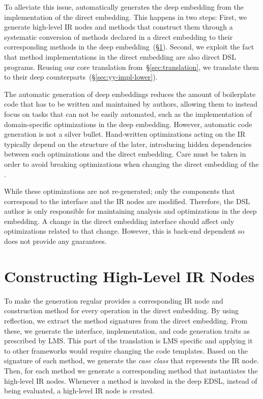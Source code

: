 To alleviate this issue, \yy automatically generates the deep embedding from
the implementation of the direct embedding. This happens in two steps: First, we
generate high-level IR nodes and methods that construct them through a
systematic conversion of methods declared in a direct embedding to their
corresponding methods in the deep embedding~(\S \ref{sec:yy-impl-def}).
%
Second, we exploit the fact that method implementations in the direct
embedding are also direct DSL programs.  Reusing our core translation
from~\S \ref{sec:translation}, we translate them to their deep
counterparts~(\S \ref{sec:yy-impl-lower}).



The automatic generation of deep embeddings reduces the amount of
boilerplate code that has to be written and maintained by \edsl
authors, allowing them to instead focus on tasks that can not be
easily automated, such as the implementation of domain-specific
optimizations in the deep embedding.  However, automatic code
generation is not a silver bullet.  Hand-written optimizations acting
on the IR typically depend on the structure of the later, introducing
hidden dependencies between such optimizations and the direct
embedding.  Care must be taken in order to avoid breaking
optimizations when changing the direct embedding of the \edsl.

 While these optimizations are not re-generated; only the
 components that correspond to the interface and the IR nodes are
 modified. Therefore, the DSL author is only responsible for
 maintaining analysis and optimizations in the deep embedding. A change
 in the direct embedding interface should affect only optimizations
 related to that change. However, this is back-end dependent so \yy
 does not provide any guarantees.


\section{Constructing High-Level IR Nodes}
\label{sec:yy-impl-def}

To make the generation regular \yy provides a corresponding IR node and
construction method for every operation in the direct embedding. By using
reflection, we extract the method signatures from the direct embedding. From
these, we generate the interface, implementation, and code generation traits as
prescribed by LMS. This part of the translation is LMS specific and applying it
to other frameworks would require changing the code templates. Based on the
signature of each method, we generate the \emph{case class} that represents the
IR node. Then, for each method we generate a corresponding method that
instantiates the high-level IR nodes. Whenever a method is invoked in the deep
EDSL, instead of being evaluated, a high-level IR node is created.

